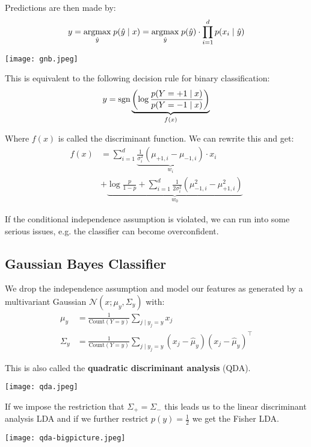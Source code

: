 Predictions are then made by:
$$y = \underset{\hat y}{\text{argmax}} \; p(\hat y \; | \; x) = \underset{\hat y}{\text{argmax}} \; p(\hat y) \cdot \prod_{i=1}^d p(x_i \; | \; \hat y)$$

\begin{center}
	\texttt{[image: gnb.jpeg]}
\end{center}

This is equivalent to the following decision rule for binary classification:
$$y = \text{sgn} \underbrace{\left( \log \frac{p(Y = +1 \; | \; x)}{p(Y = -1 \; | \; x)} \right)}_{f(x)}$$

Where $f(x)$ is called the discriminant function. We can rewrite this and get:
\begin{align*}
f(x) &= \sum_{i=1}^d \underbrace{\frac{1}{\sigma_i^2} (\mu_{+1,i} - \mu_{-1,i})}_{w_i} \cdot x_i \\
&+ \underbrace{\log \frac{p}{1-p} + \sum_{i=1}^d \frac{1}{2 \sigma_i^2} (\mu_{-1, i}^2 - \mu_{+1, i}^2)}_{w_0}
\end{align*}

If the conditional independence assumption is violated, we can run into some serious issues, e.g. the classifier can become overconfident.

\subsection{Gaussian Bayes Classifier}

We drop the independence assumption and model our features as generated by a multivariant Gaussian $\mathcal{N}(x; \mu_y, \Sigma_y)$ with:
\begin{align*}
	\mu_{y} &= \frac{1}{\text{Count}(Y = y)} \sum_{j \; | \; y_j = y} x_{j}\\
	\Sigma_{y} &= \frac{1}{\text{Count}(Y = y)} \sum_{j \; | \; y_j = y} (x_{j} - \hat \mu_{y}) (x_{j} - \hat \mu_{y})^\top
\end{align*}

This is also called the \textbf{quadratic discriminant analysis} (QDA). 

\begin{center}
	\texttt{[image: qda.jpeg]}
\end{center}

If we impose the restriction that $\Sigma_+ = \Sigma_-$ this leads us to the linear discriminant analysis LDA and if we further restrict $p(y) = \frac{1}{2}$ we get the Fisher LDA.

\begin{center}
	\texttt{[image: qda-bigpicture.jpeg]}
\end{center}

